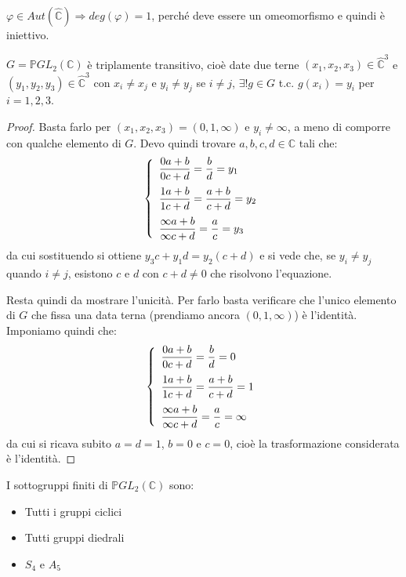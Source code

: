 \begin{osservazione}
$\varphi \in Aut( \hat{\mathbb{C}} ) \Longrightarrow deg(\varphi )=1$, perché deve essere un omeomorfismo e quindi è iniettivo. 
\end{osservazione}


\begin{lemma}
$G= \mathbb{P}GL_2 (\mathbb{C} )$ è triplamente transitivo, cioè date due terne
$(x_1 , x_2 , x_3 ) \in \hat{\mathbb{C}}^3$ e $(y_1 , y_2 , y_3 ) \in \hat{\mathbb{C}}^3$
con $x_i \neq x_j$ e $y_i \neq y_j$ se $i \neq j$, $\exists ! g \in G$ t.c. $g(x_i )=y_i$ per $i=1,2,3$.
\end{lemma}
\begin{proof}
Basta farlo per $(x_1 , x_2 , x_3 ) = (0,1,\infty )$ e $y_i \neq \infty$, a meno di comporre con qualche elemento di $G$.
Devo quindi trovare $a,b,c,d \in \mathbb{C}$ tali che:
$$
\left\{
\begin{array}{l}
\medskip
\displaystyle{\frac{0a+b}{0c+d}=\frac{b}{d}=y_1} \\
\medskip
\displaystyle{\frac{1a+b}{1c+d}=\frac{a+b}{c+d}=y_2} \\
\displaystyle{\frac{\infty a+b}{\infty c+d}=\frac{a}{c}=y_3}
\end{array}
\right.
$$
da cui sostituendo si ottiene $y_3 c + y_1 d=y_2 (c+d)$ e si vede che, se $y_i \neq y_j$ quando $i \neq j$, esistono $c$ e $d$ con $c+d \neq 0$ che risolvono l'equazione.

Resta quindi da mostrare l'unicità. Per farlo basta verificare che l'unico elemento di $G$ che fissa una data terna
(prendiamo ancora $(0,1,\infty )$) è l'identità. Imponiamo quindi che:
$$
\left\{
\begin{array}{l}
\medskip
\displaystyle{\frac{0a+b}{0c+d}=\frac{b}{d}=0} \\
\medskip
\displaystyle{\frac{1a+b}{1c+d}=\frac{a+b}{c+d}=1} \\
\displaystyle{\frac{\infty a+b}{\infty c+d}=\frac{a}{c}= \infty}
\end{array}
\right.
$$
da cui si ricava subito $a=d=1$, $b=0$ e $c=0$, cioè la trasformazione considerata è l'identità.
\end{proof}

\begin{esercizio}
I sottogruppi finiti di $\mathbb{P}GL_2 (\mathbb{C} )$ sono:
\begin{itemize}
\item Tutti i gruppi ciclici
\item Tutti gruppi diedrali
\item $S_4$ e $A_5$
\end{itemize}
\end{esercizio}


